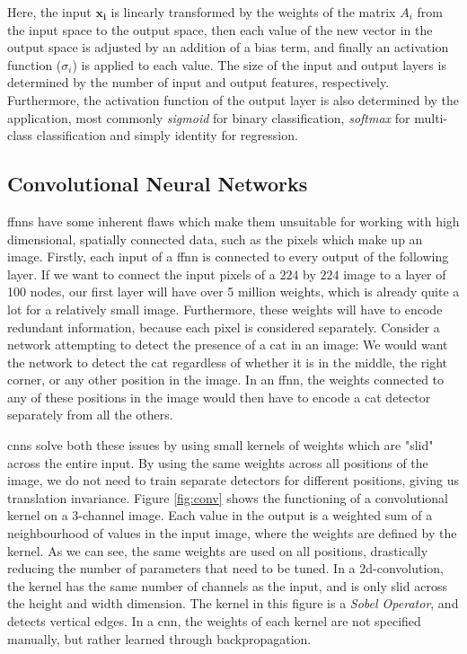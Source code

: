 \documentclass[UKenglish]{uiomasterthesis} %
\theoremstyle{definition}
\begin{document}
Here, the input $\bm{x_i}$ is linearly transformed by the weights of the matrix $A_i$ from the input space to the output space, then each value of the new vector in the output space is adjusted by an addition of a bias term, and finally an activation function ($\sigma_i$) is applied to each value. The size of the input and output layers is determined by the number of input and output features, respectively. Furthermore, the activation function of the output layer is also determined by the application, most commonly {\it sigmoid} for binary classification, {\it softmax} for multi-class classification and simply identity for regression.


\subsection{Convolutional Neural Networks} \label{section:cnn}

\acp{ffnn} have some inherent flaws which make them unsuitable for working with high dimensional, spatially connected data, such as the pixels which make up an image. Firstly, each input of a \ac{ffnn} is connected to every output of the following layer. If we want to connect the input pixels of a $224$ by $224$ image to a layer of 100 nodes, our first layer will have over 5 million weights, which is already quite a lot for a relatively small image. Furthermore, these weights will have to encode redundant information, because each pixel is considered separately. Consider a network attempting to detect the presence of a cat in an image: We would want the network to detect the cat regardless of whether it is in the middle, the right corner, or any other position in the image. In an \ac{ffnn}, the weights connected to any of these positions in the image would then have to encode a cat detector separately from all the others.

\acp{cnn} solve both these issues by using small kernels of weights which are "slid" across the entire input. By using the same weights across all positions of the image, we do not need to train separate detectors for different positions, giving us translation invariance. Figure \ref{fig:conv} shows the functioning of a convolutional kernel on a 3-channel image. Each value in the output is a weighted sum of a neighbourhood of values in the input image, where the weights are defined by the kernel. As we can see, the same weights are used on all positions, drastically reducing the number of parameters that need to be tuned. In a 2d-convolution, the kernel has the same number of channels as the input, and is only slid across the height and width dimension. The kernel in this figure is a {\it Sobel Operator}, and detects vertical edges. In a \ac{cnn}, the weights of each kernel are not specified manually, but rather learned through backpropagation.
\end{document}
